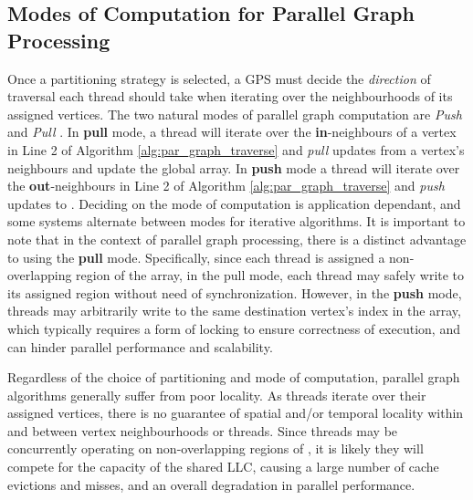 \subsection{Modes of Computation for Parallel Graph Processing}\label{sec:comp_modes}

Once a partitioning strategy is selected, a \ac{GPS} must decide the \textit{direction} of traversal each thread should take when iterating over the neighbourhoods of its assigned vertices. The two natural modes of parallel graph computation are \textit{Push} and \textit{Pull} \cite{ligra, dobfs, pvp}. In \textbf{pull} mode, a thread will iterate over the \textbf{in}-neighbours of a vertex in Line 2 of Algorithm \ref{alg:par_graph_traverse} and \textit{pull} updates from a vertex's neighbours and update the global \vdata{} array. In \textbf{push} mode a thread will iterate over the \textbf{out}-neighbours in Line 2 of Algorithm \ref{alg:par_graph_traverse} and \textit{push} updates to \vdata{}. Deciding on the mode of computation is application dependant, and some systems \cite{ligra, dobfs} alternate between modes for iterative algorithms. It is important to note that in the context of parallel graph processing, there is a distinct advantage to using the \textbf{pull} mode. Specifically, since each thread is assigned a non-overlapping region of the \vdata{} array, in the pull mode, each thread may safely write to its assigned region without need of synchronization. However, in the \textbf{push} mode, threads may arbitrarily write to the same destination vertex's index in the \vdata{} array, which typically requires a form of locking to ensure correctness of execution, and can hinder parallel performance and scalability. 


Regardless of the choice of partitioning and mode of computation, parallel graph algorithms generally suffer from poor locality.  As threads iterate over their assigned vertices, there is no guarantee of spatial and/or temporal locality within and between vertex neighbourhoods or threads. Since threads may be concurrently operating on non-overlapping regions of \vdata{}, it is likely they will compete for the capacity of the shared LLC, causing a large number of cache evictions and misses, and an overall degradation in parallel performance.


